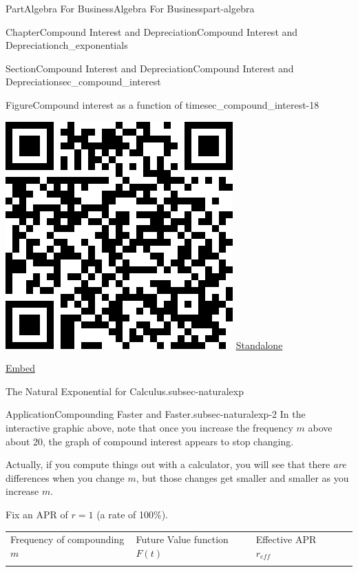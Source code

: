 \documentclass[oneside,10pt,]{tufte-book}
\newcommand{\tabularfont}{\relax}
\numberwithin{equation}{chapter}
\newcommand{\hrulemedium}{\noalign{\hrule height 0.07em}}
\begin{document}
\begin{partptx}{Part}{Algebra For Business}{}{Algebra For Business}{}{}{part-algebra}
\begin{chapterptx}{Chapter}{Compound Interest and Depreciation}{}{Compound Interest and Depreciation}{}{}{ch_exponentials}
\begin{sectionptx}{Section}{Compound Interest and Depreciation}{}{Compound Interest and Depreciation}{}{}{sec_compound_interest}
\begin{figureptx}{Figure}{Compound interest as a function of time}{sec_compound_interest-18}{}
\begin{sidebyside}{2}{0.075}{0.075}{0.17}
\begin{sbspanel}{0.21}
\includegraphics[width=\linewidth]{generated/qrcode/sec_compound_interest-18-2.png}
\href{http://webwork.bridgew.edu/oer/functions_at_work/sec_compound_interest-18-2.html}{Standalone}%
\par
\href{http://webwork.bridgew.edu/oer/functions_at_work/sec_compound_interest-18-2-if.html}{Embed}%
\end{sbspanel}%
\end{sidebyside}%
\tcblower
\end{figureptx}%
\begin{paragraphs}{The Natural Exponential for Calculus.}{subsec-naturalexp}%
\begin{insight}{Application}{Compounding Faster and Faster.}{subsec-naturalexp-2}%
In the interactive graphic above, note that once you increase the frequency \(m\) above about 20, the graph of compound interest appears to stop changing.%
\par
Actually, if you compute things out with a calculator, you will see that there \emph{are} differences when you change \(m\), but those changes get smaller and smaller as you increase \(m\).%
\par
Fix an APR of \(r=1\) (a rate  of 100\%).%
\begin{center}%
{\tabularfont%
\begin{tabular}{lBlBl}
Frequency of compounding \(m\)&Future Value function \(F(t)\)&Effective APR \(r_{eff}\)\tabularnewline\hrulemedium

\end{tabular}}
\end{center}
\end{insight}
\end{paragraphs}
\end{sectionptx}
\end{chapterptx}
\end{partptx}
\end{document}
